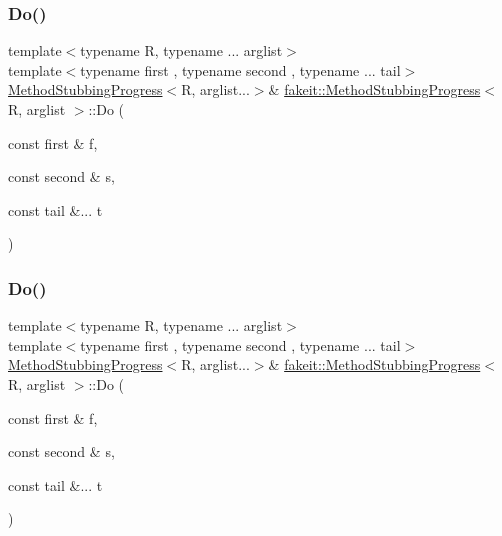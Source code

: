 \mbox{\label{structfakeit_1_1MethodStubbingProgress_a157561400e37da65c5b48f4466fc603c}} 
\subsubsection{\texorpdfstring{Do()}{Do()}\hspace{0.1cm}{\footnotesize\ttfamily [11/27]}}
{\footnotesize\ttfamily template$<$typename R, typename ... arglist$>$ \\
template$<$typename first , typename second , typename ... tail$>$ \\
\mbox{\hyperlink{structfakeit_1_1MethodStubbingProgress}{Method\+Stubbing\+Progress}}$<$R, arglist...$>$\& \mbox{\hyperlink{structfakeit_1_1MethodStubbingProgress}{fakeit\+::\+Method\+Stubbing\+Progress}}$<$ R, arglist $>$\+::Do (\begin{DoxyParamCaption}\item[{const first \&}]{f,  }\item[{const second \&}]{s,  }\item[{const tail \&...}]{t }\end{DoxyParamCaption})\hspace{0.3cm}{\ttfamily [inline]}}

\mbox{\label{structfakeit_1_1MethodStubbingProgress_a157561400e37da65c5b48f4466fc603c}} 
\subsubsection{\texorpdfstring{Do()}{Do()}\hspace{0.1cm}{\footnotesize\ttfamily [12/27]}}
{\footnotesize\ttfamily template$<$typename R, typename ... arglist$>$ \\
template$<$typename first , typename second , typename ... tail$>$ \\
\mbox{\hyperlink{structfakeit_1_1MethodStubbingProgress}{Method\+Stubbing\+Progress}}$<$R, arglist...$>$\& \mbox{\hyperlink{structfakeit_1_1MethodStubbingProgress}{fakeit\+::\+Method\+Stubbing\+Progress}}$<$ R, arglist $>$\+::Do (\begin{DoxyParamCaption}\item[{const first \&}]{f,  }\item[{const second \&}]{s,  }\item[{const tail \&...}]{t }\end{DoxyParamCaption})\hspace{0.3cm}{\ttfamily [inline]}}

